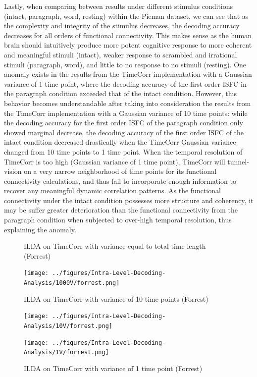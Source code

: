 \documentclass[11pt]{article}
\begin{document}
\begin{enumerate}
Lastly, when comparing between results under different stimulus conditions (intact, paragraph, word, resting) within the Pieman dataset, we can see that as the complexity and integrity of the stimulus decreases, the decoding accuracy decreases for all orders of functional connectivity. This makes sense as the human brain should intuitively produce more potent cognitive response to more coherent and meaningful stimuli (intact), weaker response to scrambled and irrational stimuli (paragraph, word), and little to no response to no stimuli (resting). One anomaly exists in the results from the TimeCorr implementation with a Gaussian variance of 1 time point, where the decoding accuracy of the first order ISFC in the paragraph condition exceeded that of the intact condition. However, this behavior becomes understandable after taking into consideration the results from the TimeCorr implementation with a Gaussian variance of 10 time points: while the decoding accuracy for the first order ISFC of the paragraph condition only showed marginal decrease, the decoding accuracy of the first order ISFC of the intact condition decreased drastically when the TimeCorr Gaussian variance changed from 10 time points to 1 time point. When the temporal resolution of TimeCorr is too high (Gaussian variance of 1 time point), TimeCorr will tunnel-vision on a very narrow neighborhood of time points for its functional connectivity calculations, and thus fail to incorporate enough information to recover any meaningful dynamic correlation patterns. As the functional connectivity under the intact condition possesses more structure and coherency, it may be suffer greater deterioration than the functional connectivity from the paragraph condition when subjected to over-high temporal resolution, thus explaining the anomaly.

\begin{figure}[!htb]
\caption{ILDA on TimeCorr with variance equal to total time length (Forrest)}
\centering
\texttt{[image: ../figures/Intra-Level-Decoding-Analysis/1000V/forrest.png]}
\label{fig:forrestDC1000}
\caption{ILDA on TimeCorr with variance of 10 time points (Forrest)}
\centering
\texttt{[image: ../figures/Intra-Level-Decoding-Analysis/10V/forrest.png]}
\label{fig:forrestDC10}
\caption{ILDA on TimeCorr with variance of 1 time point (Forrest)}
\centering
\texttt{[image: ../figures/Intra-Level-Decoding-Analysis/1V/forrest.png]}
\label{fig:forrestDC1}
\end{figure}


\end{enumerate}
\end{document}
